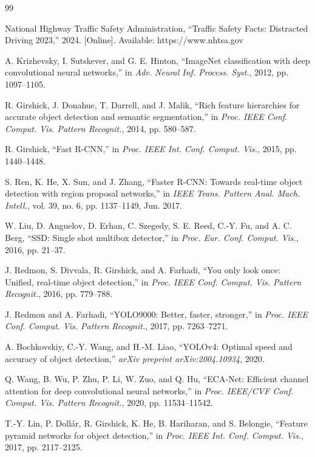 \documentclass[conference]{IEEEtran}
\begin{document}
\begin{thebibliography}{99}

 National Highway Traffic Safety Administration, ``Traffic Safety Facts: Distracted Driving 2023,'' 2024. [Online]. Available: https://www.nhtsa.gov

 A. Krizhevsky, I. Sutskever, and G. E. Hinton, ``ImageNet classification with deep convolutional neural networks,'' in \textit{Adv. Neural Inf. Process. Syst.}, 2012, pp. 1097--1105.

 R. Girshick, J. Donahue, T. Darrell, and J. Malik, ``Rich feature hierarchies for accurate object detection and semantic segmentation,'' in \textit{Proc. IEEE Conf. Comput. Vis. Pattern Recognit.}, 2014, pp. 580--587.

 R. Girshick, ``Fast R-CNN,'' in \textit{Proc. IEEE Int. Conf. Comput. Vis.}, 2015, pp. 1440--1448.

 S. Ren, K. He, X. Sun, and J. Zhang, ``Faster R-CNN: Towards real-time object detection with region proposal networks,'' in \textit{IEEE Trans. Pattern Anal. Mach. Intell.}, vol. 39, no. 6, pp. 1137--1149, Jun. 2017.

 W. Liu, D. Anguelov, D. Erhan, C. Szegedy, S. E. Reed, C.-Y. Fu, and A. C. Berg, ``SSD: Single shot multibox detector,'' in \textit{Proc. Eur. Conf. Comput. Vis.}, 2016, pp. 21--37.

 J. Redmon, S. Divvala, R. Girshick, and A. Farhadi, ``You only look once: Unified, real-time object detection,'' in \textit{Proc. IEEE Conf. Comput. Vis. Pattern Recognit.}, 2016, pp. 779--788.

 J. Redmon and A. Farhadi, ``YOLO9000: Better, faster, stronger,'' in \textit{Proc. IEEE Conf. Comput. Vis. Pattern Recognit.}, 2017, pp. 7263--7271.

 A. Bochkovskiy, C.-Y. Wang, and H.-M. Liao, ``YOLOv4: Optimal speed and accuracy of object detection,'' \textit{arXiv preprint arXiv:2004.10934}, 2020.

 Q. Wang, B. Wu, P. Zhu, P. Li, W. Zuo, and Q. Hu, ``ECA-Net: Efficient channel attention for deep convolutional neural networks,'' in \textit{Proc. IEEE/CVF Conf. Comput. Vis. Pattern Recognit.}, 2020, pp. 11534--11542.

 T.-Y. Lin, P. Dollár, R. Girshick, K. He, B. Hariharan, and S. Belongie, ``Feature pyramid networks for object detection,'' in \textit{Proc. IEEE Int. Conf. Comput. Vis.}, 2017, pp. 2117--2125.


\end{thebibliography}
\end{document}
